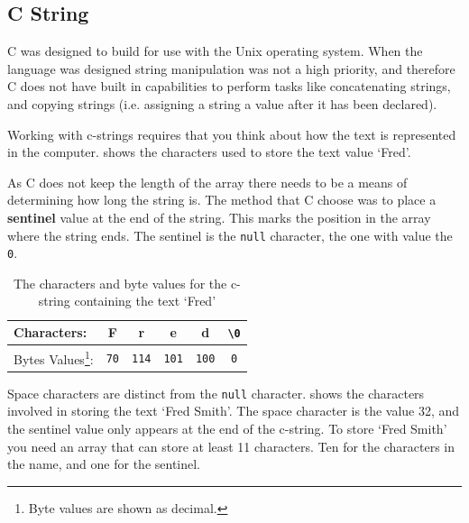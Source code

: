 \clearpage
\subsection{C String} %
\label{sub:c_string}

C was designed to build for use with the Unix operating system. When the language was designed string manipulation was not a high priority, and therefore C does not have built in capabilities to perform tasks like concatenating strings, and copying strings (i.e. assigning a string a value after it has been declared).

Working with c-strings requires that you think about how the text is represented in the computer.  shows the characters used to store the text value `Fred'. 

As C does not keep the length of the array there needs to be a means of determining how long the string is. The method that C choose was to place a \textbf{sentinel} value at the end of the string. This marks the position in the array where the string ends. The sentinel is the \texttt{null} character, the one with value the \texttt{0}.

\begin{table}[h]
\begin{minipage}{\textwidth}
  \centering
\begin{tabular}{|l|c|c|c|c|c|}
\hline
Characters: & F & r & e & d & \texttt{\textbackslash 0} \\
\hline
Bytes Values\footnote{Byte values are shown as decimal.}: & \texttt{70} & \texttt{114} & \texttt{101} & \texttt{100} & \texttt{0} \\
\hline
\end{tabular}
\caption{The characters and byte values for the c-string containing the text `Fred'}
\label{tbl:c-string-fred}
\end{minipage}
\end{table}

Space characters are distinct from the \texttt{null} character.  shows the characters involved in storing the text `Fred Smith'. The space character is the value 32, and the sentinel value only appears at the end of the c-string. To store `Fred Smith' you need an array that can store at least 11 characters. Ten for the characters in the name, and one for the sentinel.

